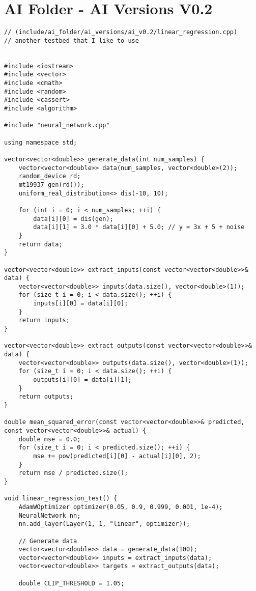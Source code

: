 \section*{AI Folder - AI Versions V0.2}
\begin{verbatim}
// (include/ai_folder/ai_versions/ai_v0.2/linear_regression.cpp)
// another testbed that I like to use


#include <iostream>
#include <vector>
#include <cmath>
#include <random>
#include <cassert>
#include <algorithm>

#include "neural_network.cpp"

using namespace std;

vector<vector<double>> generate_data(int num_samples) {
    vector<vector<double>> data(num_samples, vector<double>(2));
    random_device rd;
    mt19937 gen(rd());
    uniform_real_distribution<> dis(-10, 10);

    for (int i = 0; i < num_samples; ++i) {
        data[i][0] = dis(gen);
        data[i][1] = 3.0 * data[i][0] + 5.0; // y = 3x + 5 + noise
    }
    return data;
}

vector<vector<double>> extract_inputs(const vector<vector<double>>& data) {
    vector<vector<double>> inputs(data.size(), vector<double>(1));
    for (size_t i = 0; i < data.size(); ++i) {
        inputs[i][0] = data[i][0];
    }
    return inputs;
}

vector<vector<double>> extract_outputs(const vector<vector<double>>& data) {
    vector<vector<double>> outputs(data.size(), vector<double>(1));
    for (size_t i = 0; i < data.size(); ++i) {
        outputs[i][0] = data[i][1];
    }
    return outputs;
}

double mean_squared_error(const vector<vector<double>>& predicted, const vector<vector<double>>& actual) {
    double mse = 0.0;
    for (size_t i = 0; i < predicted.size(); ++i) {
        mse += pow(predicted[i][0] - actual[i][0], 2);
    }
    return mse / predicted.size();
}

void linear_regression_test() {
    AdamWOptimizer optimizer(0.05, 0.9, 0.999, 0.001, 1e-4);
    NeuralNetwork nn;
    nn.add_layer(Layer(1, 1, "linear", optimizer));

    // Generate data
    vector<vector<double>> data = generate_data(100);
    vector<vector<double>> inputs = extract_inputs(data);
    vector<vector<double>> targets = extract_outputs(data);

    double CLIP_THRESHOLD = 1.05;


\end{verbatim}
